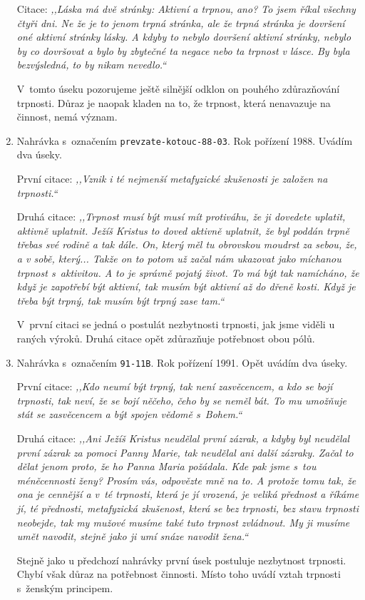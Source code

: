 \begin{enumerate}
{      Citace: \textit{%
        ,,Láska má dvě stránky: Aktivní a trpnou, ano? To jsem říkal všechny
        čtyři dni. Ne že je to jenom trpná stránka, ale že trpná stránka je
        dovršení oné aktivní stránky lásky. A kdyby to nebylo dovršení aktivní
        stránky, nebylo by co dovršovat a bylo by zbytečné ta negace nebo ta
        trpnost v lásce. By byla bezvýsledná, to by nikam nevedlo.``
      }

      V~tomto úseku pozorujeme ještě silnější odklon on pouhého zdůrazňování
      trpnosti. Důraz je naopak kladen na to, že trpnost, která nenavazuje na
      činnost, nemá význam.
  }
  \item{
      Nahrávka s~označením \texttt{prevzate-kotouc-88-03}. Rok pořízení 1988.
      Uvádím dva úseky.

      První citace: \textit{%
        ,,Vznik i té nejmenší metafyzické zkušenosti je založen na trpnosti.``
      }

      Druhá citace: \textit{%
        ,,Trpnost musí být musí mít protiváhu, že ji dovedete uplatit, aktivně
        uplatnit. Ježíš Kristus to doved aktivně uplatnit, že byl poddán trpně
        třebas své rodině a tak dále. On, který měl tu obrovskou moudrst za
        sebou, že, a v sobě, který... Takže on to potom už začal nám ukazovat
        jako míchanou trpnost s~aktivitou. A to je správně pojatý život. To má
        být tak namícháno, že když je zapotřebí být aktivní, tak musím být
        aktivní až do dřeně kosti. Když je třeba být trpný, tak musím být trpný
        zase tam.``
      }

      V~první citaci se jedná o postulát nezbytnosti trpnosti, jak jsme viděli u
      raných výroků. Druhá citace opět zdůrazňuje potřebnost obou pólů.
  }
  \item{
      Nahrávka s~označením \texttt{91-11B}. Rok pořízení 1991. Opět uvádím dva
      úseky.

      První citace: \textit{%
        ,,Kdo neumí být trpný, tak není zasvěcencem, a kdo se bojí trpnosti, tak
        neví, že se bojí něčeho, čeho by se neměl bát. To mu umožňuje stát se
        zasvěcencem a být spojen vědomě s~Bohem.``
      }

      Druhá citace: \textit{%
        ,,Ani Ježíš Kristus neudělal první zázrak, a kdyby byl neudělal první
        zázrak za pomoci Panny Marie, tak neudělal ani další zázraky. Začal to
        dělat jenom proto, že ho Panna Maria požádala. Kde pak jsme s~tou
        méněcennosti ženy? Prosím vás, odpovězte mně na to. A protože tomu tak,
        že ona je cennější a v~té trpnosti, která je jí vrozená, je veliká
        přednost a říkáme jí, té přednosti, metafyzická zkušenost, která se bez
        trpnosti, bez stavu trpnosti neobejde, tak my mužové musíme také tuto
        trpnost zvládnout. My ji musíme umět navodit, stejně jako ji umí snáze
        navodit žena.``
      }

      Stejně jako u předchozí nahrávky první úsek postuluje nezbytnost trpnosti.
      Chybí však důraz na potřebnost činnosti. Místo toho uvádí vztah trpnosti
      s~ženským principem.
  }
\end{enumerate}

